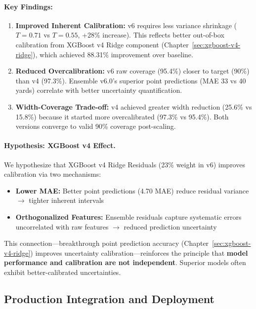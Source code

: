 \paragraph{Key Findings:}

\begin{enumerate}[itemsep=2pt,parsep=0pt]
    \item \textbf{Improved Inherent Calibration:} v6 requires less variance shrinkage ($T = 0.71$ vs $T = 0.55$, +28\% increase). This reflects better out-of-box calibration from XGBoost v4 Ridge component (Chapter~\ref{sec:xgboost-v4-ridge}), which achieved 88.31\% improvement over baseline.

    \item \textbf{Reduced Overcalibration:} v6 raw coverage (95.4\%) closer to target (90\%) than v4 (97.3\%). Ensemble v6.0's superior point predictions (MAE 33 vs 40 yards) correlate with better uncertainty quantification.

    \item \textbf{Width-Coverage Trade-off:} v4 achieved greater width reduction (25.6\% vs 15.8\%) because it started more overcalibrated (97.3\% vs 95.4\%). Both versions converge to valid 90\% coverage post-scaling.
\end{enumerate}

\paragraph{Hypothesis: XGBoost v4 Effect.}
We hypothesize that XGBoost v4 Ridge Residuals (23\% weight in v6) improves calibration via two mechanisms:

\begin{itemize}[itemsep=2pt,parsep=0pt]
    \item \textbf{Lower MAE:} Better point predictions (4.70 MAE) reduce residual variance $\to$ tighter inherent intervals
    \item \textbf{Orthogonalized Features:} Ensemble residuals capture systematic errors uncorrelated with raw features $\to$ reduced prediction uncertainty
\end{itemize}

This connection---breakthrough point prediction accuracy (Chapter~\ref{sec:xgboost-v4-ridge}) improves uncertainty calibration---reinforces the principle that \textbf{model performance and calibration are not independent}. Superior models often exhibit better-calibrated uncertainties.

\subsection{Production Integration and Deployment}

